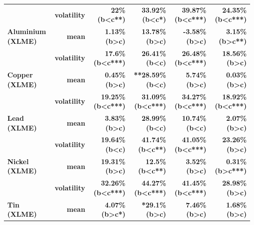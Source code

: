 \documentclass[
  authoryear,
  preprint,
  3p]{elsarticle}
\begin{document}
\begin{longtable}[t]{>{}l>{}r>{}r>{}r>{}r>{}r}
\textbf{} & \textbf{volatility} & \textcolor[HTML]{4285f4}{\textbf{22\% (b<c**)}} & \textcolor[HTML]{4285f4}{\textbf{33.92\% (b<c*)}} & \textcolor[HTML]{4285f4}{\textbf{39.87\% (b<c***)}} & \textcolor[HTML]{4285f4}{\textbf{24.35\% (b<c***)}}\\
\textbf{Aluminium (XLME)} & \textbf{mean} & \textcolor[HTML]{4285f4}{\textbf{1.13\% (b>c)}} & \textcolor[HTML]{4285f4}{\textbf{13.78\% (b>c)}} & \textcolor[HTML]{4285f4}{\textbf{-3.58\% (b>c)}} & \textcolor[HTML]{4285f4}{\textbf{3.15\% (b>c**)}}\\
\textbf{} & \textbf{volatility} & \textcolor[HTML]{4285f4}{\textbf{17.6\% (b<c***)}} & \textcolor[HTML]{4285f4}{\textbf{26.41\% (b<c)}} & \textcolor[HTML]{4285f4}{\textbf{26.48\% (b<c***)}} & \textcolor[HTML]{4285f4}{\textbf{18.56\% (b>c)}}\\
\addlinespace
\textbf{Copper (XLME)} & \textbf{mean} & \textcolor[HTML]{4285f4}{\textbf{0.45\% (b>c)}} & \textcolor[HTML]{4285f4}{\textbf{**28.59\% (b<c)}} & \textcolor[HTML]{4285f4}{\textbf{5.74\% (b>c)}} & \textcolor[HTML]{4285f4}{\textbf{0.03\% (b>c)}}\\
\textbf{} & \textbf{volatility} & \textcolor[HTML]{4285f4}{\textbf{19.25\% (b<c***)}} & \textcolor[HTML]{4285f4}{\textbf{31.09\% (b<c***)}} & \textcolor[HTML]{4285f4}{\textbf{34.27\% (b<c***)}} & \textcolor[HTML]{4285f4}{\textbf{18.92\% (b<c***)}}\\
\textbf{Lead (XLME)} & \textbf{mean} & \textcolor[HTML]{4285f4}{\textbf{3.83\% (b>c)}} & \textcolor[HTML]{4285f4}{\textbf{28.99\% (b<c)}} & \textcolor[HTML]{4285f4}{\textbf{10.74\% (b<c)}} & \textcolor[HTML]{4285f4}{\textbf{2.07\% (b>c)}}\\
\textbf{} & \textbf{volatility} & \textcolor[HTML]{4285f4}{\textbf{19.64\% (b<c)}} & \textcolor[HTML]{4285f4}{\textbf{41.74\% (b<c**)}} & \textcolor[HTML]{4285f4}{\textbf{41.05\% (b<c***)}} & \textcolor[HTML]{4285f4}{\textbf{23.26\% (b>c)}}\\
\textbf{Nickel (XLME)} & \textbf{mean} & \textcolor[HTML]{4285f4}{\textbf{19.31\% (b>c)}} & \textcolor[HTML]{4285f4}{\textbf{12.5\% (b<c**)}} & \textcolor[HTML]{4285f4}{\textbf{3.52\% (b>c)}} & \textcolor[HTML]{4285f4}{\textbf{0.31\% (b>c***)}}\\
\addlinespace
\textbf{} & \textbf{volatility} & \textcolor[HTML]{4285f4}{\textbf{32.26\% (b<c***)}} & \textcolor[HTML]{4285f4}{\textbf{44.27\% (b<c***)}} & \textcolor[HTML]{4285f4}{\textbf{41.45\% (b<c***)}} & \textcolor[HTML]{4285f4}{\textbf{28.98\% (b>c)}}\\
\textbf{Tin (XLME)} & \textbf{mean} & \textcolor[HTML]{4285f4}{\textbf{4.07\% (b>c*)}} & \textcolor[HTML]{4285f4}{\textbf{*29.1\% (b>c)}} & \textcolor[HTML]{4285f4}{\textbf{7.46\% (b>c)}} & \textcolor[HTML]{4285f4}{\textbf{1.68\% (b>c)}}\\

\end{longtable}
\end{document}
